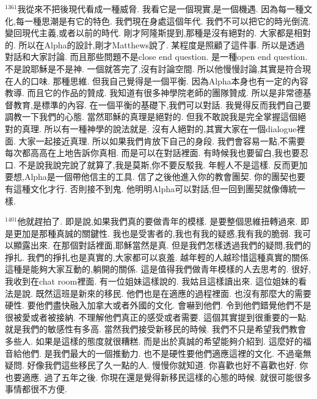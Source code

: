 \documentclass{book}
\begin{document}
$^{1361}$我從來不把後現代看成一種威脅.
我看它是一個現實,是一個機遇.
因為每一種文化,每一種思潮是有它的特色.
我們現在身處這個年代.
我們不可以把它的時光倒流.
變回現代主義,或者以前的時代.
剛才阿隆斯提到,那種是沒有絕對的.
大家都是相對的.
所以在Alpha的設計,剛才Matthews說了.
某程度是照顧了這件事.
所以是透過對話和大家討論.
而且那些問題不是close end question.
是一種open end question.
不是說耶穌是不是神.
一個就答完了,沒有討論空間.
所以他慢慢討論,其實是符合現在人的口味.
那種思維.
但我自己覺得是一個平衡.
因為Alpha本身也有一定的內容教導.
而且它的作品的贊成.
我知道有很多神學院老師的團隊贊成.
所以是非常德基督教育,是標準的內容.
在一個平衡的基礎下,我們可以對話.
我覺得反而我們自己要調教一下我們的心態.
當然耶穌的真理是絕對的.
但我不敢說我是完全掌握這個絕對的真理.
所以有一種神學的說法就是.
沒有人絕對的,其實大家在一個dialogue裡面.
大家一起接近真理.
所以如果我們肯放下自己的身段.
我們會容易一點,不需要每次都高高在上地告訴你真相.
而是可以在對話裡面.
有時候我也要留白,我也要忍口.
不是說我說完說了就算了,我是莫斯,你不要反駁我.
年輕人不是這樣.
反而更加要想,Alpha是一個帶他信主的工具.
信了之後他進入你的教會團契.
你的團契也要有這種文化才行.
否則接不到鬼.
他明明Alpha可以對話,但一回到團契就像傳統一樣.

$^{1401}$他就趕拍了.
即是說,如果我們真的要做青年的模樣.
是要整個思維扭轉過來.
即是更加是那種真誠的關鍵性.
我也是受害者的,我也有我的疑惑,我有我的脆弱.
我可以顯露出來.
在那個對話裡面,耶穌當然是真.
但是我們怎樣透過我們的疑問,我們的掙扎.
我們的掙扎也是真實的,大家都可以哀羞.
越年輕的人越珍惜這種真實的關係.
這種是能夠大家互動的,躺開的關係.
這是值得我們做青年模樣的人去思考的.
很好,我收到在chat room裡面.
有一位姐妹這樣說的.
我姑且這樣讀出來.
這位姐妹的看法是說.
既然這班是新來的移民.
他們也是在適應的過程裡面.
也沒有那麼大的需要硬性.
要他們盡快融入加拿大或者外國的文化.
會嚇到他們.
令到他們錯覺他們不是很被愛或者被接納.
不理解他們真正的感受或者需要.
這個其實提到很重要的一點.
就是我們的敏感性有多高.
當然我們接受新移民的時候.
我們不只是希望我們教會多些人.
如果是這樣的態度就很糟糕.
而是出於真誠的希望能夠介紹到.
這麼好的福音給他們.
是我們最大的一個推動力.
也不是硬性要他們適應這裡的文化.
不過毫無疑問.
好像我們這些移民了久一點的人.
慢慢你就知道.
你喜歡也好不喜歡也好.
你也要適應.
過了五年之後.
你現在還是覺得新移民這樣的心態的時候.
就很可能很多事情都很不方便.
\end{document}
